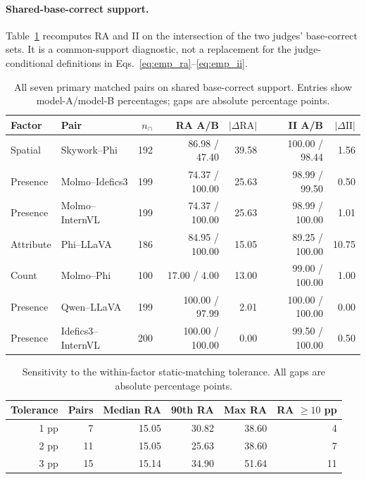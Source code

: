 \paragraph{Shared-base-correct support.}
Table~\ref{tab:shared-base-correct-full} recomputes RA and II on the
intersection of the two judges' base-correct sets. It is a common-support
diagnostic, not a replacement for the judge-conditional definitions in
Eqs.~\ref{eq:emp_ra}--\ref{eq:emp_ii}.

\begin{table}[t]
\centering
\scriptsize
\caption{All seven primary matched pairs on shared base-correct support.
Entries show model-A/model-B percentages; gaps are absolute percentage points.}
\label{tab:shared-base-correct-full}
\setlength{\tabcolsep}{5pt}
\begin{tabular}{llrrrrr}
\toprule
Factor & Pair & $n_{\cap}$ & RA A/B & $|\Delta\mathrm{RA}|$ & II A/B & $|\Delta\mathrm{II}|$ \\
\midrule
Spatial & Skywork--Phi & 192 & 86.98 / 47.40 & 39.58 & 100.00 / 98.44 & 1.56 \\
Presence & Molmo--Idefics3 & 199 & 74.37 / 100.00 & 25.63 & 98.99 / 99.50 & 0.50 \\
Presence & Molmo--InternVL & 199 & 74.37 / 100.00 & 25.63 & 98.99 / 100.00 & 1.01 \\
Attribute & Phi--LLaVA & 186 & 84.95 / 100.00 & 15.05 & 89.25 / 100.00 & 10.75 \\
Count & Molmo--Phi & 100 & 17.00 / 4.00 & 13.00 & 99.00 / 100.00 & 1.00 \\
Presence & Qwen--LLaVA & 199 & 100.00 / 97.99 & 2.01 & 100.00 / 100.00 & 0.00 \\
Presence & Idefics3--InternVL & 200 & 100.00 / 100.00 & 0.00 & 99.50 / 100.00 & 0.50 \\
\bottomrule
\end{tabular}
\end{table}

\begin{table}[t]
\centering
\scriptsize
\caption{Sensitivity to the within-factor static-matching
tolerance. All gaps are absolute percentage points.}
\label{tab:threshold-sensitivity-full}
\begin{tabular}{rrrrrr}
\toprule
Tolerance & Pairs & Median RA & 90th RA & Max RA & RA $\geq10$ pp \\
\midrule
1 pp & 7 & 15.05 & 30.82 & 38.60 & 4 \\
2 pp & 11 & 15.05 & 25.63 & 38.60 & 7 \\
3 pp & 15 & 15.14 & 34.90 & 51.64 & 11 \\
\bottomrule
\end{tabular}
\end{table}

